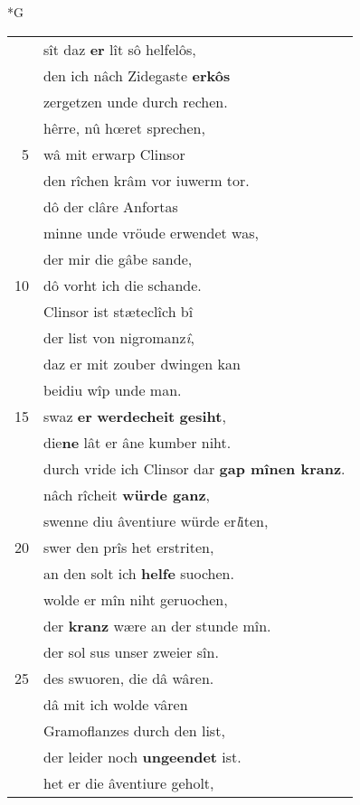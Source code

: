 \documentclass[8pt,a4paper,notitlepage]{article}
\begin{document}
\newpage
\begin{table}[ht]
\begin{minipage}[t]{0.5\linewidth}
\small
\begin{center}*G
\end{center}
\begin{tabular}{rl}
 & sît daz \textbf{er} lît sô helfelôs,\\ 
 & den ich nâch Zidegaste \textbf{erkôs}\\ 
 & zergetzen unde durch rechen.\\ 
 & hêrre, nû hœret sprechen,\\ 
5 & wâ mit erwarp Clinsor\\ 
 & den rîchen krâm vor iuwerm tor.\\ 
 & dô der clâre Anfortas\\ 
 & minne unde vröude erwendet was,\\ 
 & der mir die gâbe sande,\\ 
10 & dô vorht ich die schande.\\ 
 & Clinsor ist stæteclîch bî\\ 
 & der list von nigromanz\textit{î},\\ 
 & daz er mit zouber dwingen kan\\ 
 & beidiu wîp unde man.\\ 
15 & swaz \textbf{er} \textbf{werdecheit} \textbf{gesiht},\\ 
 & die\textbf{ne} lât er âne kumber niht.\\ 
 & durch vride ich Clinsor dar \textbf{gap mînen kranz}.\\ 
 & nâch rîcheit \textbf{würde ganz},\\ 
 & swenne diu âventiure würde er\textit{l}iten,\\ 
20 & swer den prîs het erstriten,\\ 
 & an den solt ich \textbf{helfe} suochen.\\ 
 & wolde er mîn niht geruochen,\\ 
 & der \textbf{kranz} wære an der stunde mîn.\\ 
 & der sol sus unser zweier sîn.\\ 
25 & des swuoren, die dâ wâren.\\ 
 & dâ mit ich wolde vâren\\ 
 & Gramoflanzes durch den list,\\ 
 & der leider noch \textbf{ungeendet} ist.\\ 
 & het er die âventiure geholt,\\ 

\end{tabular}
\end{minipage}
\end{table}
\end{document}
